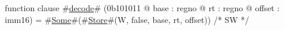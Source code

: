 function clause #\hyperref[zdecode]{decode}# (0b101011 @ base : regno @ rt : regno @ offset : imm16) =
  #\hyperref[zSome]{Some}#(#\hyperref[zStore]{Store}#(W, false, base, rt, offset)) /* SW */

